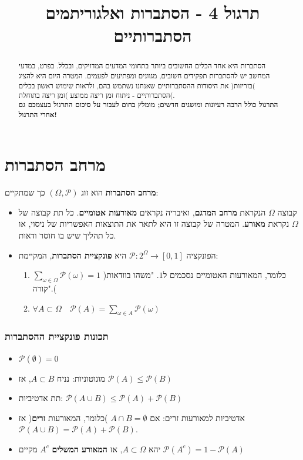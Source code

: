 \documentclass{article}
\newcommand{\Pp}{\ensuremath{\mathcal{P}}}
\begin{document}
\title{תרגול 4 - הסתברות ואלגוריתמים הסתברותיים}
\author{}
\date{}
\maketitle
\begin{abstract}
הסתברות היא אחד הכלים החשובים ביותר בתחומי המדעים המדויקים, ובכלל. בפרט, במדעי המחשב יש להסתברות תפקידים חשובים, מגוונים ומפתיעים לפעמים. המטרה היום היא להציג )בזריזות( את היסודות ההסתברותיים שאנחנו נשתמש בהם, ולראות שימוש ראשון בכלים הסתברותיים - ניתוח זמן ריצה ממוצע )זמן ריצה בתוחלת(.\\
\textbf{התרגול כולל הרבה רעיונות ומושגים חדשים; מומלץ בחום לעבור על סיכום התרגול בעצמכם גם אחרי התרגול!}
\end{abstract}

\section{מרחב הסתברות}
\begin{framed}
\textbf{מרחב הסתברות }הוא זוג $(\Omega,\Pp)$ כך שמתקיים:
\begin{itemize}
\item קבוצה $\Omega$ הנקראת \textbf{מרחב המדגם}, ואיבריה נקראים \textbf{מאורעות אטומיים}. כל תת קבוצה של $\Omega$ נקראת \textbf{מאורע}. המטרה של קבוצה זו היא לתאר את התוצאות האפשריות של ניסוי, או כל תהליך שיש בו חוסר ודאות.
\item הפונקציה $\Pp:2^\Omega \to [0,1]$ היא \textbf{פונקציית הסתברות}, המקיימת:
\begin{enumerate}
\item $\displaystyle{\sum_{\omega\in \Omega}\Pp(\omega) = 1}$ )כלומר, המאורעות האטומיים נסכמים ל$1$. "משהו בוודאות קורה".(
\item $\displaystyle{\forall A\subset \Omega \quad \Pp(A) = \sum_{\omega\in A} \Pp(\omega)}$
\end{enumerate}
\end{itemize}
\end{framed}
\subsubsection*{תכונות פונקציית ההסתברות}
\begin{itemize}
\item $\Pp(\emptyset) = 0$
\item מונוטוניות: נניח
$A\subset B$, אז
$\Pp(A)\leq \Pp(B)$
\item תת אדטיביות: $\Pp(A\cup B) \leq \Pp(A)+ \Pp(B)$
\item אדטיביות למאורעות זרים: אם 
$A\cap B=\emptyset$ )כלומר, המאורעות \textbf{זרים}( אז $\Pp(A\cup B) = \Pp(A) + \Pp(B)$.
\item יהא
$A\subset \Omega$, אז \textbf{המאורע המשלים} $A^c$ מקיים
$\Pp(A^c) = 1-\Pp(A)$
\end{itemize}
\newpage
\end{document}
